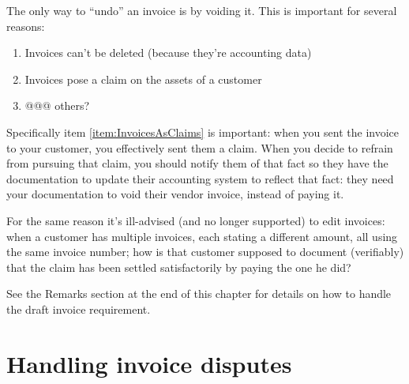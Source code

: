 The only way to ``undo'' an invoice is by voiding it. This is important for several
reasons:

\begin{enumerate}
\item Invoices can't be deleted (because they're accounting data)
\item Invoices pose a claim on the assets of a customer
\label{item:InvoicesAsClaims}
\item @@@ others?
\end{enumerate}

Specifically item \ref{item:InvoicesAsClaims} is important: when you sent the invoice
to your customer, you effectively sent them a claim. When you decide to refrain from
pursuing that claim, you should notify them of that fact so they have the documentation
to update their accounting system to reflect that fact: they need your documentation
to void their vendor invoice, instead of paying it.

For the same reason it's ill-advised (and no longer supported) to edit invoices:
when a customer has multiple invoices, each stating a different amount, all
using the same invoice number; how is that customer supposed to document (verifiably)
that the claim has been settled satisfactorily by paying the one he did?

See the Remarks section at the end of this chapter for details on how to handle
the draft invoice requirement.

\section{Handling invoice disputes}

